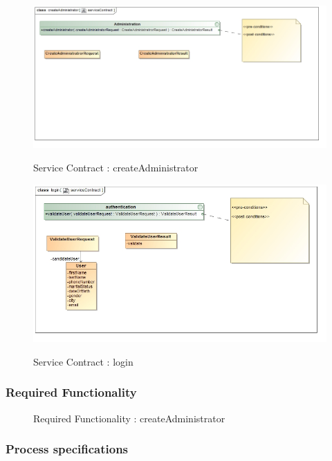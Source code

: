 \documentclass{article}
\begin{document}
		\begin{figure}[H]
		\includegraphics[width=\textwidth]{images/class__createAdministrator__serviceContract.jpg}  \\
		\caption{Service Contract : createAdministrator}
		\end{figure}

		\begin{figure}[H]
		\includegraphics[width=\textwidth]{images/class__login__serviceContract.jpg}  \\
		\caption{Service Contract : login}
		\end{figure}

		\subsubsection{Required Functionality}

		\begin{figure}[H]
		\caption{Required Functionality : createAdministrator}
		\end{figure}

		\subsubsection{Process specifications}
\end{document}
